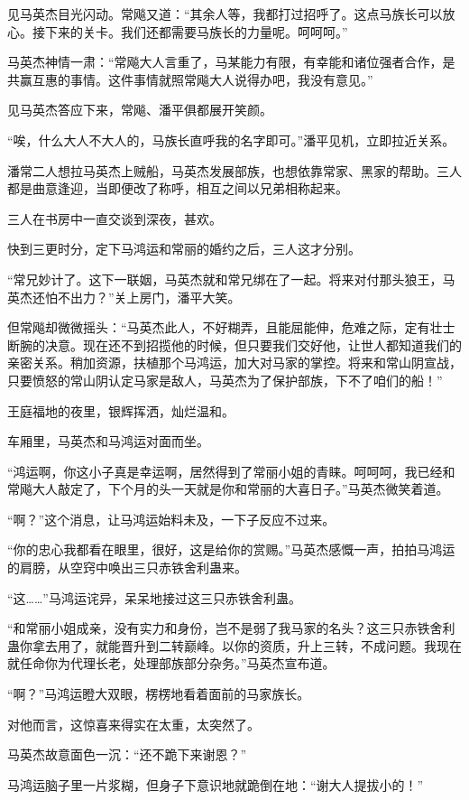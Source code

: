 \begin{this_body}
见马英杰目光闪动。常飚又道：“其余人等，我都打过招呼了。这点马族长可以放心。接下来的关卡。我们还都需要马族长的力量呢。呵呵呵。”

马英杰神情一肃：“常飚大人言重了，马某能力有限，有幸能和诸位强者合作，是共赢互惠的事情。这件事情就照常飚大人说得办吧，我没有意见。”

见马英杰答应下来，常飚、潘平俱都展开笑颜。

“唉，什么大人不大人的，马族长直呼我的名字即可。”潘平见机，立即拉近关系。

潘常二人想拉马英杰上贼船，马英杰发展部族，也想依靠常家、黑家的帮助。三人都是曲意逢迎，当即便改了称呼，相互之间以兄弟相称起来。

三人在书房中一直交谈到深夜，甚欢。

快到三更时分，定下马鸿运和常丽的婚约之后，三人这才分别。

“常兄妙计了。这下一联姻，马英杰就和常兄绑在了一起。将来对付那头狼王，马英杰还怕不出力？”关上房门，潘平大笑。

但常飚却微微摇头：“马英杰此人，不好糊弄，且能屈能伸，危难之际，定有壮士断腕的决意。现在还不到招揽他的时候，但只要我们交好他，让世人都知道我们的亲密关系。稍加资源，扶植那个马鸿运，加大对马家的掌控。将来和常山阴宣战，只要愤怒的常山阴认定马家是敌人，马英杰为了保护部族，下不了咱们的船！”

王庭福地的夜里，银辉挥洒，灿烂温和。

车厢里，马英杰和马鸿运对面而坐。

“鸿运啊，你这小子真是幸运啊，居然得到了常丽小姐的青睐。呵呵呵，我已经和常飚大人敲定了，下个月的头一天就是你和常丽的大喜日子。”马英杰微笑着道。

“啊？”这个消息，让马鸿运始料未及，一下子反应不过来。

“你的忠心我都看在眼里，很好，这是给你的赏赐。”马英杰感慨一声，拍拍马鸿运的肩膀，从空窍中唤出三只赤铁舍利蛊来。

“这……”马鸿运诧异，呆呆地接过这三只赤铁舍利蛊。

“和常丽小姐成亲，没有实力和身份，岂不是弱了我马家的名头？这三只赤铁舍利蛊你拿去用了，就能晋升到二转巅峰。以你的资质，升上三转，不成问题。我现在就任命你为代理长老，处理部族部分杂务。”马英杰宣布道。

“啊？”马鸿运瞪大双眼，楞楞地看着面前的马家族长。

对他而言，这惊喜来得实在太重，太突然了。

马英杰故意面色一沉：“还不跪下来谢恩？”

马鸿运脑子里一片浆糊，但身子下意识地就跪倒在地：“谢大人提拔小的！”


\end{this_body}
